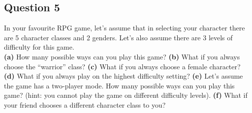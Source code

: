 
\newpage





\subsection*{Question 5}
In your favourite RPG game, let's assume that in selecting your character there are 5 character classes and 2 genders. Let's also assume there are 3 levels of difficulty for this game.\\[-0.2cm]

{\bf(a)} How many possible ways can you play this game? 
{\bf(b)} What if you always choose the ``warrior'' class? 
{\bf(c)} What if you always choose a female character? 
{\bf(d)} What if you always play on the highest difficulty setting? 
{\bf(e)} Let's assume the game has a two-player mode. How many possible ways can you play this game? (hint: you cannot play the game on different difficulty levels). {\bf(f)} What if your friend chooses a different character class to you?

